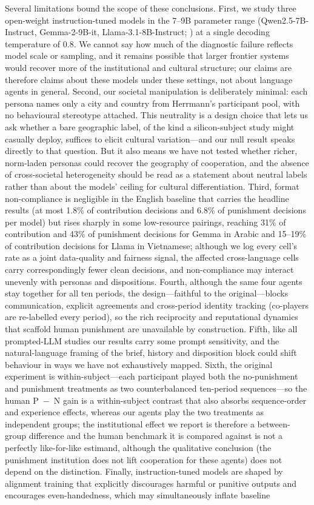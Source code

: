 \documentclass[openacc]{rsproca_new}
\begin{document}
Several limitations bound the scope of these conclusions. First, we study three open-weight instruction-tuned models in the 7--9B parameter range (Qwen2.5-7B-Instruct, Gemma-2-9B-it, Llama-3.1-8B-Instruct; \cite{qwen2025,gemma2024,llama2024}) at a single decoding temperature of 0.8. We cannot say how much of the diagnostic failure reflects model scale or sampling, and it remains possible that larger frontier systems would recover more of the institutional and cultural structure; our claims are therefore claims about these models under these settings, not about language agents in general. Second, our societal manipulation is deliberately minimal: each persona names only a city and country from Herrmann's participant pool, with no behavioural stereotype attached. This neutrality is a design choice that lets us ask whether a bare geographic label, of the kind a silicon-subject study might casually deploy, suffices to elicit cultural variation---and our null result speaks directly to that question. But it also means we have not tested whether richer, norm-laden personas could recover the geography of cooperation, and the absence of cross-societal heterogeneity should be read as a statement about neutral labels rather than about the models' ceiling for cultural differentiation. Third, format non-compliance is negligible in the English baseline that carries the headline results (at most 1.8\% of contribution decisions and 6.8\% of punishment decisions per model) but rises sharply in some low-resource pairings, reaching 31\% of contribution and 43\% of punishment decisions for Gemma in Arabic and 15--19\% of contribution decisions for Llama in Vietnamese; although we log every cell's rate as a joint data-quality and fairness signal, the affected cross-language cells carry correspondingly fewer clean decisions, and non-compliance may interact unevenly with personas and dispositions. Fourth, although the same four agents stay together for all ten periods, the design---faithful to the original---blocks communication, explicit agreements and cross-period identity tracking (co-players are re-labelled every period), so the rich reciprocity and reputational dynamics that scaffold human punishment are unavailable by construction. Fifth, like all prompted-LLM studies our results carry some prompt sensitivity, and the natural-language framing of the brief, history and disposition block could shift behaviour in ways we have not exhaustively mapped. Sixth, the original experiment is within-subject---each participant played both the no-punishment and punishment treatments as two counterbalanced ten-period sequences---so the human P~$-$~N gain is a within-subject contrast that also absorbs sequence-order and experience effects, whereas our agents play the two treatments as independent groups; the institutional effect we report is therefore a between-group difference and the human benchmark it is compared against is not a perfectly like-for-like estimand, although the qualitative conclusion (the punishment institution does not lift cooperation for these agents) does not depend on the distinction. Finally, instruction-tuned models are shaped by alignment training that explicitly discourages harmful or punitive outputs and encourages even-handedness, which may simultaneously inflate baseline 
\end{document}
